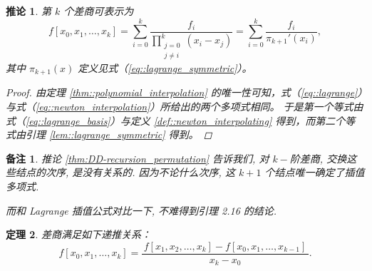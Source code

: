\documentclass[a4paper]{ctexart}
\newtheorem{theorem}{定理}
\newtheorem{remark}{备注}
\newtheorem{corollary}[theorem]{推论}
\numberwithin{theorem}{section}
\numberwithin{equation}{section}
\numberwithin{figure}{section}
\numberwithin{remark}{section}
\begin{document}
\begin{corollary}
    \label{cor::newton_explicit}
第 $k$ 个差商可表示为
\begin{equation}
    \label{eq::newton_explicit}
f[x_0,x_1,\ldots,x_k]
=\sum_{i=0}^{k}\frac{f_i}{\displaystyle\prod_{\substack{j=0\\ j\ne i}}^{k}(x_i-x_j)}
=\sum_{i=0}^{k}\frac{f_i}{\pi_{k+1}'(x_i)},
\end{equation}
其中 $\pi_{k+1}(x)$ 定义见式（\ref{eq::lagrange_symmetric}）。
\begin{proof}
由定理 \ref{thm::polynomial_interpolation} 的唯一性可知，式（\ref{eq::lagrange}）与式（\ref{eq::newton_interpolation}）所给出的两个多项式相同。
于是第一个等式由式（\ref{eq::lagrange_basis}）与定义 \ref{def::newton_interpolating} 得到，而第二个等式由引理 \ref{lem::lagrange_symmetric} 得到。
\end{proof}
\end{corollary}


\begin{remark}
推论 \ref{thm:DD-recursion_permutation} 告诉我们, 对 $k-$阶差商, 交换这些结点的次序, 是没有关系的. 因为不论什么次序,
这 $k + 1$ 个结点唯一确定了插值多项式.

而和 Lagrange 插值公式对比一下, 不难得到引理 2.16 的结论.


    
\end{remark}


\begin{theorem}
    \label{thm:DD-recursion}
差商满足如下递推关系：
\begin{equation}
    \label{eq::DD-recursion}
f[x_0,x_1,\ldots,x_k]
=\frac{\,f[x_1,x_2,\ldots,x_k]-f[x_0,x_1,\ldots,x_{k-1}]\,}{x_k-x_0}.
\end{equation}
\end{theorem}
\end{document}
